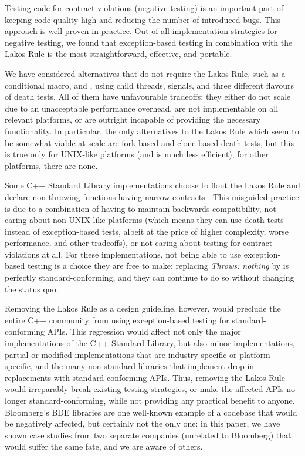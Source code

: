 Testing code for contract violations (negative testing) is an important part of keeping code quality high and reducing the number of introduced bugs. This approach is well-proven in practice. Out of all implementation strategies for negative testing, we found that exception-based testing in combination with the Lakos Rule is the most straightforward, effective, and portable.

We have considered alternatives that do not require the Lakos Rule, such as a conditional  macro,  and , using child threads, signals, and three different flavours of death tests. All of them have unfavourable tradeoffs: they either do not scale due to an unacceptable performance overhead, are not implementable on all relevant platforms, or are outright incapable of providing the necessary functionality. In particular, the only alternatives to the Lakos Rule which seem to be somewhat viable at scale are fork-based and clone-based death tests, but this is true only for UNIX-like platforms (and is much less efficient); for other platforms, there are none.

Some C++ Standard Library implementations choose to flout the Lakos Rule and declare non-throwing functions having narrow contracts . This misguided practice is due to a combination of having to maintain backwards-compatibility, not caring about non-UNIX-like platforms (which means they can use death tests instead of exception-based tests, albeit at the price of higher complexity, worse performance, and other tradeoffs), or not caring about testing for contract violations at all. For these implementations, not being able to use exception-based testing is a choice they are free to make: replacing \emph{Throws: nothing} by  is perfectly standard-conforming, and they can continue to do so without changing the status quo.

Removing the Lakos Rule as a design guideline, however, would preclude the entire C++ community from using exception-based testing for standard-conforming APIs. This regression would affect not only the major implementations of the C++ Standard Library, but also minor implementations, partial or modified implementations that are industry-specific or platform-specific, and the many non-standard libraries that implement drop-in replacements with standard-conforming APIs. Thus, removing the Lakos Rule would irreparably break existing testing strategies, or make the affected APIs no longer standard-conforming, while not providing any practical benefit to anyone. Bloomberg's BDE libraries are one well-known example of a codebase that would be negatively affected, but certainly not the only one: in this paper, we have shown case studies from two separate companies (unrelated to Bloomberg) that would suffer the same fate, and we are aware of others.

